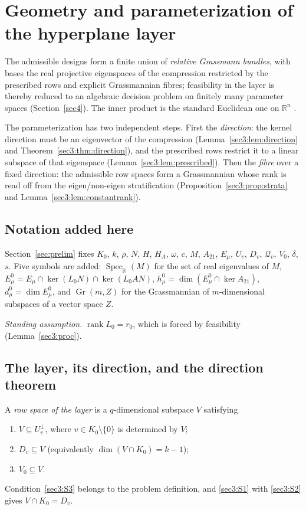 \documentclass[journal]{IEEEtran}
\theoremstyle{plainn}
\theoremstyle{remark}
\newcommand{\rank}{\operatorname{rank}}
\newcommand{\Gr}{\operatorname{Gr}}
\begin{document}
\section{Geometry and parameterization of the hyperplane layer}
\label{sec3}
The admissible designs form a finite union of \emph{relative Grassmann bundles}, with bases the real
projective eigenspaces of the compression restricted by the prescribed rows and explicit Grassmannian
fibres; feasibility in the layer is thereby reduced to an algebraic decision problem on finitely many
parameter spaces (Section~\ref{sec4}). The inner product is the standard Euclidean one on
$\mathbb{R}^n$ \cite{hj13}.

The parameterization has two independent steps. First the \emph{direction}: the kernel direction must
be an eigenvector of the compression (Lemma~\ref{sec3:lem:direction} and
Theorem~\ref{sec3:thm:direction}), and the prescribed rows restrict it to a linear subspace of that
eigenspace (Lemma~\ref{sec3:lem:prescribed}). Then the \emph{fibre} over a fixed direction: the
admissible row spaces form a Grassmannian whose rank is read off from the eigen/non-eigen
stratification (Proposition~\ref{sec3:prop:strata} and Lemma~\ref{sec3:lem:constantrank}).

\subsection{Notation added here}
\label{sec3:sub:notation}
Section~\ref{sec:prelim} fixes $K_0$, $k$, $\rho$, $N$, $H$, $H_A$, $\omega$, $c$, $M$, $A_{21}$,
$E_\mu$, $U_v$, $D_v$, $\mathcal Q_v$, $V_0$, $\delta$, $s$. Five symbols are added:
$\operatorname{Spec}_{\mathbb R}(M)$ for the set of real eigenvalues of $M$,
$E_\mu^0=E_\mu\cap\ker(L_0N)\cap\ker(L_0AN)$,
$h_\mu^0=\dim(E_\mu^0\cap\ker A_{21})$, $d_\mu^0=\dim E_\mu^0$, and $\Gr(m,Z)$ for the Grassmannian of
$m$-dimensional subspaces of a vector space $Z$.

\noindent\emph{Standing assumption.} $\rank L_0=r_0$, which is forced by feasibility
(Lemma~\ref{sec3:proc}).

\subsection{The layer, its direction, and the direction theorem}
\label{sec3:sub:struct}
\label{sec3:sub:direction}
A \emph{row space of the layer} is a $q$-dimensional subspace $V$ satisfying
\begin{enumerate}[label=(S\arabic*),ref={(S\arabic*)},leftmargin=2.6em,itemsep=1pt,topsep=2pt]
\item\label{sec3:S1} $V\subseteq U_v^\perp$, where $v\in K_0\setminus\{0\}$ is determined by $V$;
\item\label{sec3:S2} $D_v\subseteq V$ (equivalently $\dim(V\cap K_0)=k-1$);
\item\label{sec3:S3} $V_0\subseteq V$.
\end{enumerate}
Condition~\ref{sec3:S3} belongs to the problem definition, and \ref{sec3:S1} with \ref{sec3:S2} gives
$V\cap K_0=D_v$.
\end{document}
